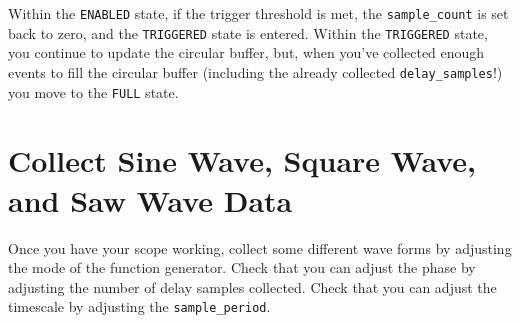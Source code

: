 \documentclass[12pt]{article}
\begin{document}
Within the {\tt ENABLED} state, if the trigger threshold is met, the {\tt sample\_count} is set back to zero, and the {\tt TRIGGERED} state is entered.
Within the {\tt TRIGGERED} state, you continue to update the circular buffer, but, when you've collected enough events to fill the circular buffer (including the already collected {\tt delay\_samples}!) you move to the {\tt FULL} state.

\section{Collect Sine Wave, Square Wave, and Saw Wave Data}

Once you have your scope working, collect some different wave forms by adjusting the mode of the function generator.  Check that you can adjust the phase by adjusting the number of delay samples collected.  Check that you can adjust the timescale by adjusting the {\tt sample\_period}.
\end{document}
